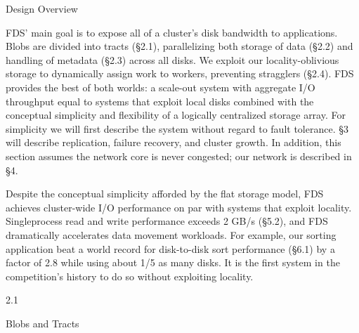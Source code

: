 Design Overview

FDS’ main goal is to expose all of a cluster’s disk
bandwidth to applications. Blobs are divided into tracts
(§2.1), parallelizing both storage of data (§2.2) and handling of metadata (§2.3) across all disks. We exploit our
locality-oblivious storage to dynamically assign work to
workers, preventing stragglers (§2.4). FDS provides the
best of both worlds: a scale-out system with aggregate
I/O throughput equal to systems that exploit local disks
combined with the conceptual simplicity and flexibility
of a logically centralized storage array.
For simplicity we will first describe the system without regard to fault tolerance. §3 will describe replication,
failure recovery, and cluster growth. In addition, this section assumes the network core is never congested; our
network is described in §4.

Despite the conceptual simplicity afforded by the flat
storage model, FDS achieves cluster-wide I/O performance on par with systems that exploit locality. Singleprocess read and write performance exceeds 2 GB/s
(§5.2), and FDS dramatically accelerates data movement
workloads. For example, our sorting application beat a
world record for disk-to-disk sort performance (§6.1) by
a factor of 2.8 while using about 1/5 as many disks. It
is the first system in the competition’s history to do so
without exploiting locality.

2.1

Blobs and Tracts

